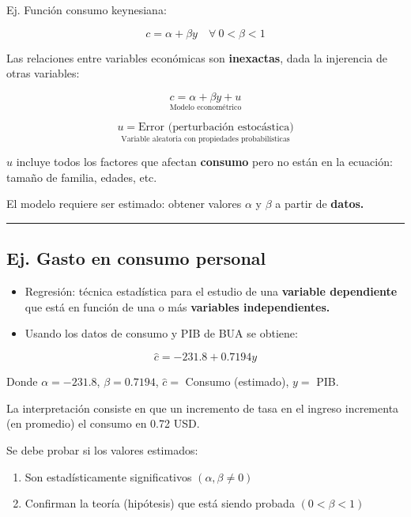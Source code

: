 \documentclass[
]{book}
\providecommand{\tightlist}{%
  \setlength{\itemsep}{0pt}\setlength{\parskip}{0pt}}
\begin{document}
Ej. Función consumo keynesiana:

\[
c = \alpha + \beta y \quad \forall \ 0< \beta <1
\]

Las relaciones entre variables económicas son \textbf{inexactas}, dada la injerencia de otras variables:

\[ 
\underset{\text{Modelo econométrico} }{c = \alpha + \beta y + u}
\]

\[ 
\underset{ \text{Variable aleatoria con propiedades probabilísticas} }{ u = \text{Error (perturbación estocástica)} } 
\]

\(u\) incluye todos los factores que afectan \textbf{consumo} pero no están en la ecuación: tamaño de familia, edades, etc.

El modelo requiere ser estimado: obtener valores \(\alpha\) y \(\beta\) a partir de \textbf{datos.}

\begin{center}\rule{0.5\linewidth}{0.5pt}\end{center}

\hypertarget{ej.-gasto-en-consumo-personal}{%
\subsection{Ej. Gasto en consumo personal}\label{ej.-gasto-en-consumo-personal}}

\begin{itemize}
\tightlist
\item
  Regresión: técnica estadística para el estudio de una \textbf{variable dependiente} que está en función de una o más \textbf{variables independientes.}
\item
  Usando los datos de consumo y PIB de BUA se obtiene:
\end{itemize}

\[ 
\hat{c} = -231.8 + 0.7194 y
\]

Donde \(\alpha = -231.8\), \(\beta = 0.7194\), \(\hat{c} =\) Consumo (estimado), \(y =\) PIB.

La interpretación consiste en que un incremento de tasa en el ingreso incrementa (en promedio) el consumo en 0.72 USD.

Se debe probar si los valores estimados:

\begin{enumerate}
\def\labelenumi{\arabic{enumi}.}
\tightlist
\item
  Son estadísticamente significativos \((\alpha, \beta \neq 0)\)\\
\item
  Confirman la teoría (hipótesis) que está siendo probada \((0<\beta<1)\)
\end{enumerate}
\end{document}
